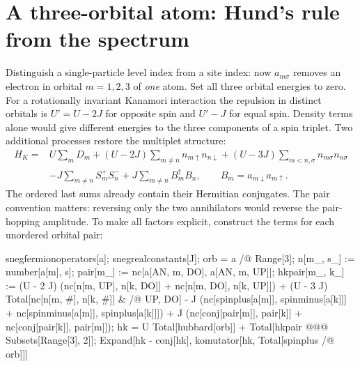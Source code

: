 \section{A three-orbital atom: Hund's rule from the spectrum}
Distinguish a single-particle level index from a site index: now
$a_{m\sigma}$ removes an electron in orbital $m=1,2,3$ of \emph{one}
atom. Set all three orbital energies to zero. For a rotationally
invariant Kanamori interaction the repulsion in distinct orbitals is
$U'=U-2J$ for opposite spin and $U'-J$ for equal spin. Density terms
alone would give different energies to the three components of a spin
triplet. Two additional processes restore the multiplet structure:
\begin{align}
 H_K={}&U\sum_m D_m+
 (U-2J)\sum_{m\ne n} n_{m\uparrow}n_{n\downarrow}
 +(U-3J)\sum_{m<n,\sigma} n_{m\sigma}n_{n\sigma}\nonumber\\
 &-J\sum_{m\ne n} S_m^+ S_n^-
 +J\sum_{m\ne n} B_m^\dagger B_n,\qquad
 B_m=a_{m\downarrow}a_{m\uparrow}.
 \label{eq:kanamori}
\end{align}
The ordered last sums already contain their Hermitian conjugates. The
pair convention matters: reversing only the two annihilators would
reverse the pair-hopping amplitude. To make all factors explicit,
construct the terms for each unordered orbital pair:
\begin{wl}
snegfermionoperators[a];
snegrealconstants[J];
orb = a /@ Range[3];
n[m_, s_] := number[a[m], s];
pair[m_] := nc[a[AN, m, DO], a[AN, m, UP]];
hkpair[m_, k_] := (U - 2 J) (nc[n[m, UP], n[k, DO]] +
    nc[n[m, DO], n[k, UP]]) +
  (U - 3 J) Total[nc[n[m, #], n[k, #]] & /@ {UP, DO}] -
  J (nc[spinplus[a[m]], spinminus[a[k]]] +
     nc[spinminus[a[m]], spinplus[a[k]]]) +
  J (nc[conj[pair[m]], pair[k]] + nc[conj[pair[k]], pair[m]]);
hk = U Total[hubbard[orb]] + Total[hkpair @@@ Subsets[Range[3], {2}]];
Expand[{hk - conj[hk], komutator[hk, Total[spinplus /@ orb]]}]
\end{wl}

